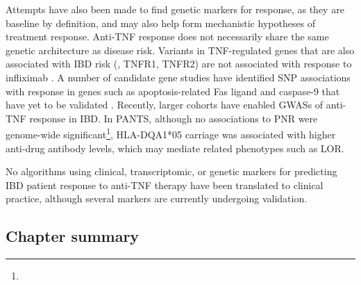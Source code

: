 \begin{outline}
Attempts have also been made to find genetic markers for response,
as they are baseline by definition, and may also help form mechanistic hypotheses of treatment response.
Anti-TNF response does not necessarily share the same genetic architecture as disease risk.
Variants in \gls{TNF}-regulated genes that are also associated with \gls{IBD} risk (, TNFR1, TNFR2) are not associated with response to infliximab \autocite{digby-bell2019InterrogatingHostImmunity,noor2020PersonalisedMedicineCrohn}.
A number of candidate gene studies have identified \gls{SNP} associations with response in genes such as apoptosis-related Fas ligand and caspase-9 that have yet to be validated \autocite{flamant2018InflammatoryBowelDisease,burke2018GeneticMarkersPredict}.
Recently, larger cohorts have enabled \glspl{GWAS} of anti-\gls{TNF} response in \gls{IBD}.
In \gls{PANTS}, although no associations to \gls{PNR} were genome-wide significant\footnote{},
HLA-DQA1*05 carriage was associated with higher anti-drug antibody levels\autocite{sazonovs2019HLADQA105Carriage}, which may mediate related phenotypes such as \gls{LOR}.

No algorithms using clinical, transcriptomic, or genetic markers for predicting \gls{IBD} patient response to anti-\gls{TNF} therapy have been translated to clinical practice,
although several markers are currently undergoing validation\autocite{noor2020PersonalisedMedicineCrohn}.

\subsection{Chapter summary}


\end{outline}

